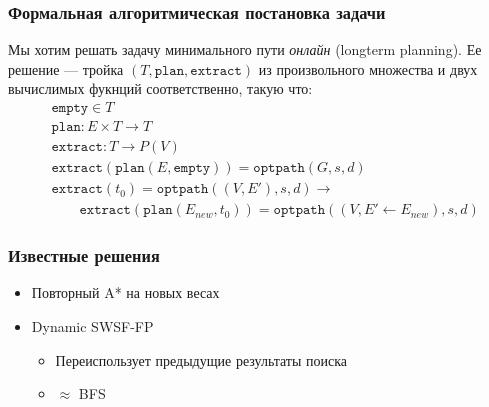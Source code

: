 \documentclass{beamer}
\newcommand{\fplan}{\mathtt{plan}}
\newcommand{\fextract}{\mathtt{extract}}
\newcommand{\fempty}{\mathtt{empty}}
\begin{document}
    \begin{frame}[fragile]
        \frametitle{Формальная алгоритмическая постановка задачи}

        Мы хотим решать задачу минимального пути \textit{онлайн} (longterm planning).
        Ее решение --- тройка $(T, \fplan, \fextract)$ из произвольного множества и двух вычислимых фукнций соответственно, такую что:
        \begin{align*}
            &\fempty \in T \\
            &\fplan: E \times T \rightarrow T \\
            &\fextract: T \rightarrow P(V) \\
            &\fextract(\fplan(E, \fempty)) = \mathtt{optpath}(G, s, d) \\
            &\fextract(t_0) = \mathtt{optpath}((V, E'), s, d) \rightarrow \\
            &\qquad \fextract(\fplan(E_{new}, t_0)) = \mathtt{optpath}((V, E' \leftarrow E_{new}), s, d)
        \end{align*}

    \end{frame}


    \begin{frame}
        \frametitle{Известные решения}
        \begin{itemize}
            \item Повторный A* на новых весах
            \item Dynamic SWSF-FP
            \begin{itemize}
                \item Переиспользует предыдущие результаты поиска
                \item $\approx$ BFS
            \end{itemize}
        \end{itemize}
    \end{frame}
\end{document}
